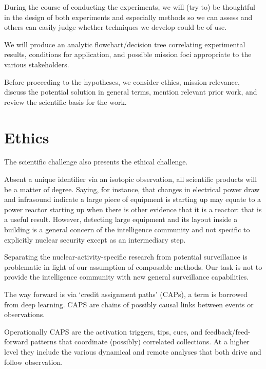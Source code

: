 \documentclass{article} %
\begin{document}
During the course of conducting the experiments, we will (try to) be thoughtful in the design of both experiments and especially methods so we can assess and others can easily judge whether techniques we develop could be of use.

We will produce an analytic flowchart/decision tree correlating experimental results, conditions for application, and possible mission foci appropriate to the various stakeholders.


\vspace{20 pt}
\begin{center}
\end{center}
\vspace{20 pt}

Before proceeding to the hypotheses, we consider ethics, mission relevance, discuss the potential solution in general terms, mention relevant prior work, and review the scientific basis for the work.

\pagebreak
\section {Ethics }
The scientific challenge also presents the ethical challenge. 

Absent a unique identifier via an isotopic observation, all scientific products will be a matter of degree. Saying, for instance, that changes in electrical power draw and infrasound indicate a large piece of equipment is starting up may equate to a power reactor starting up when there is other evidence that it is a reactor: that is a useful result. However, detecting large equipment and its layout inside a building is a general concern of the intelligence community and not specific to explicitly nuclear security except as an intermediary step.

Separating the nuclear-activity-specific research from potential surveillance is problematic in light of our assumption of composable methods. Our task is not to provide the intelligence community with new general surveillance capabilities. 

The way forward is via `credit assignment paths' (CAPs), a term is borrowed from deep learning. CAPS are chains of possibly causal links between events or observations. 

Operationally CAPS are the activation triggers, tips, cues, and feedback/feed-forward patterns that coordinate (possibly) correlated collections. At a higher level they include the various dynamical and remote analyses that both drive and follow observation.
\end{document}
